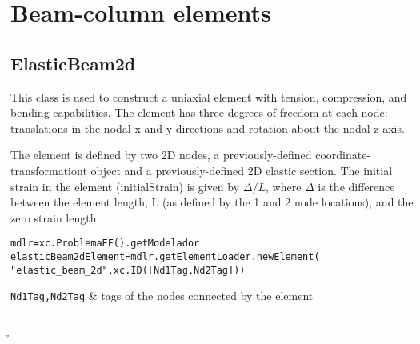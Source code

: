 \begin{methodsTable}
\ElementMeth{}
\ElementOneDMeth{}
\ProtoTrussMeth{}
\end{methodsTable}

\section{Beam-column elements}

\subsection{ElasticBeam2d}
This class is used to construct a uniaxial element with tension, compression, and bending capabilities. The element has three degrees of freedom at each node: translations in the nodal x and y directions and rotation about the nodal z-axis.

The element is defined by two 2D nodes, a previously-defined coordinate-transformationt object and a previously-defined 2D elastic section. The initial strain in the element (initialStrain) is given by $\Delta/L$, where $\Delta$ is the difference between the element length, L (as defined by the 1 and 2 node locations), and the zero strain length. 

\begin{verbatim}
mdlr=xc.ProblemaEF().getModelador
elasticBeam2dElement=mdlr.getElementLoader.newElement(
"elastic_beam_2d",xc.ID([Nd1Tag,Nd2Tag]))
\end{verbatim}
\begin{paramFuncTable}
{\tt Nd1Tag,Nd2Tag} & tags of the nodes connected by the element\\
\end{paramFuncTable}

\begin{paramClassTable}
\ElementParam{}
\ElementOneDParam{}
\ProtoBeamTwoDParam{}
\rhoX{} \\
\h{}  \\
\initialStrain{} \\
\getV{} \\
\getVOne{} \\
\getVTwo{} \\
\getNOne{} \\
\getNTwo{} \\
\getMOne{} \\
\getMTwo{} \\
\end{paramClassTable}

